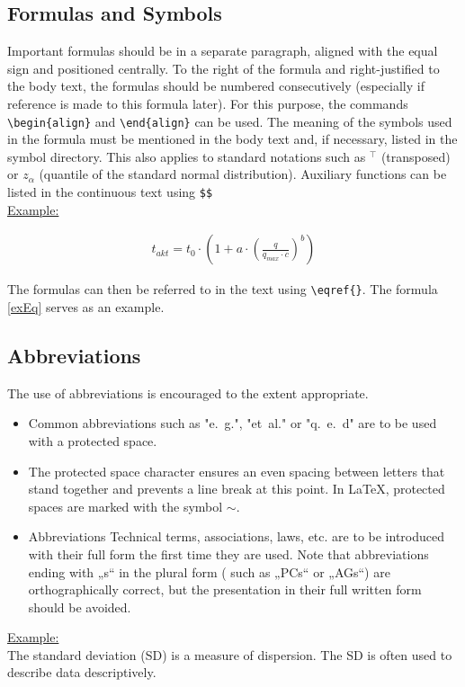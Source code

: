 \subsection{Formulas and Symbols}
Important formulas should be in a separate paragraph, aligned with the equal sign and positioned centrally. To the right of the formula and right-justified to the body text, the formulas should be numbered consecutively (especially if reference is made to this formula later). For this purpose, the commands \verb!\begin{align}! and \verb!\end{align}! can be used. The meaning of the symbols used in the formula must be mentioned in the body text and, if necessary, listed in the symbol directory. This also applies to standard notations such as $^\top$ (transposed) or $z_{\alpha}$ (quantile of the standard normal distribution). Auxiliary functions can be listed in the continuous text using \verb!$$!\\
\uline{Example:}

\begin{align}\label{exEq}
    t_{akt}= t_0 \cdot \left( 1+a \cdot\left( \frac{q}{q_{max} \cdot c} \right) ^b \right)
\end{align}

The formulas can then be referred to in the text using \verb!\eqref{}!. The formula \eqref{exEq} serves as an example.

\subsection{Abbreviations}
The use of abbreviations is encouraged to the extent appropriate. 
\begin{itemize}
    \item Common abbreviations such as "e.~g.", "et~al." or "q.~e.~d" are to be used with a protected space.
    \item The protected space character ensures an even spacing between letters that stand together and prevents a line break at this point. In \LaTeX, protected spaces are marked with the symbol $\sim$. 
    \item Abbreviations Technical terms, associations, laws, etc. are to be introduced with their full form the first time they are used. Note that abbreviations ending with „s“ in the plural form ( such as „PCs“ or „AGs“) are orthographically correct, but the presentation in their full written form should be avoided.
\end{itemize}
\uline{Example:}
\\
The standard deviation (SD) is a measure of dispersion. The SD is often used to describe data descriptively.

